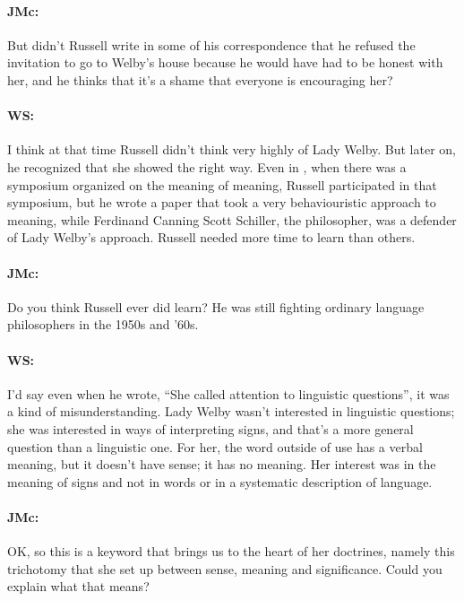 \documentclass[output=paper]{langscibook}
\begin{document}
\paragraph*{JMc:} But didn’t Russell write in some of his correspondence that he refused the invitation to go to Welby’s house because he would have had to be honest with her, and he thinks that it’s a shame that everyone is encouraging her?

\paragraph*{WS:} I think at that time Russell didn’t think very highly of Lady Welby. But later on, he recognized that she showed the right way. Even in \citeyear{schiller1920a}, when there was a symposium organized on the meaning of meaning, Russell participated in that symposium, but he wrote a paper that took a very behaviouristic approach to meaning, while Ferdinand Canning Scott Schiller, the philosopher, was a defender of Lady Welby’s approach. Russell needed more time to learn than others.

\paragraph*{JMc:} Do you think Russell ever did learn? He was still fighting ordinary language philosophers in the 1950s and ’60s.

\paragraph*{WS:} I’d say even when he wrote, ``She called attention to linguistic questions'', it was a kind of misunderstanding. Lady Welby wasn’t interested in linguistic questions; she was interested in ways of interpreting signs, and that’s a more general question than a linguistic one. For her, the word outside of use has a verbal meaning, but it doesn’t have sense; it has no meaning. Her interest was in the meaning of signs and not in words or in a systematic description of language.

\paragraph*{JMc:} OK, so this is a keyword that brings us to the heart of her doctrines, namely this trichotomy that she set up between sense, meaning and significance. Could you explain what that means?
\end{document}
